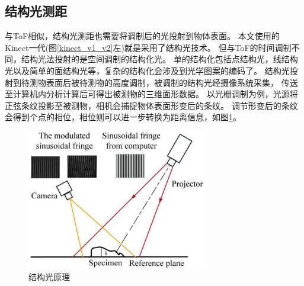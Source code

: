 \subsection{结构光测距}
与ToF相似，结构光测距也需要将调制后的光投射到物体表面。
本文使用的Kinect一代(图\ref{kinect_v1_v2}左)就是采用了结构光技术。
但与ToF的时间调制不同，结构光法投射的是空间调制的结构化光。
单的结构化包括点结构光，线结构光以及简单的面结构光等，复杂的结构化会涉及到光学图案的编码了。
结构光投射到待测物表面后被待测物的高度调制，被调制的结构光经摄像系统采集，
传送至计算机内分析计算后可得出被测物的三维面形数据。
以光栅调制为例，光源将正弦条纹投影至被测物，相机会捕捉物体表面形变后的条纹。
调节形变后的条纹会得到个点的相位，相位则可以进一步转换为距离信息，如图\ref{str_lighting}。
\begin{figure}[h]
    \centering
    \includegraphics[width = 0.7\textwidth]{./Pictures/str_lighting.eps}
    \caption{结构光原理}
    \label{str_lighting}
\end{figure}

